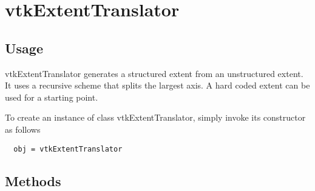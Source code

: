 \section{vtkExtentTranslator}

\subsection{Usage}

 vtkExtentTranslator generates a structured extent from an unstructured
 extent.  It uses a recursive scheme that splits the largest axis.  A hard
 coded extent can be used for a starting point.

To create an instance of class vtkExtentTranslator, simply
invoke its constructor as follows
\begin{verbatim}
  obj = vtkExtentTranslator
\end{verbatim}
\subsection{Methods}

